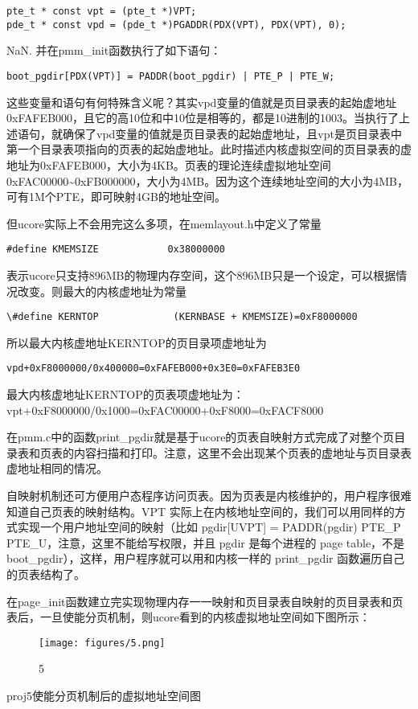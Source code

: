\begin{lstlisting}
pte_t * const vpt = (pte_t *)VPT;
pde_t * const vpd = (pde_t *)PGADDR(PDX(VPT), PDX(VPT), 0);
\end{lstlisting}

NaN. 并在pmm\_init函数执行了如下语句：

\begin{lstlisting}
boot_pgdir[PDX(VPT)] = PADDR(boot_pgdir) | PTE_P | PTE_W;
\end{lstlisting}

这些变量和语句有何特殊含义呢？其实vpd变量的值就是页目录表的起始虚地址0xFAFEB000，且它的高10位和中10位是相等的，都是10进制的1003。当执行了上述语句，就确保了vpd变量的值就是页目录表的起始虚地址，且vpt是页目录表中第一个目录表项指向的页表的起始虚地址。此时描述内核虚拟空间的页目录表的虚地址为0xFAFEB000，大小为4KB。页表的理论连续虚拟地址空间0xFAC00000\textasciitilde{}0xFB000000，大小为4MB。因为这个连续地址空间的大小为4MB，可有1M个PTE，即可映射4GB的地址空间。

但ucore实际上不会用完这么多项，在memlayout.h中定义了常量

\begin{lstlisting}
#define KMEMSIZE            0x38000000
\end{lstlisting}

表示ucore只支持896MB的物理内存空间，这个896MB只是一个设定，可以根据情况改变。则最大的内核虚地址为常量

\begin{lstlisting}
\#define KERNTOP             (KERNBASE + KMEMSIZE)=0xF8000000
\end{lstlisting}

所以最大内核虚地址KERNTOP的页目录项虚地址为

\begin{lstlisting}
vpd+0xF8000000/0x400000=0xFAFEB000+0x3E0=0xFAFEB3E0
\end{lstlisting}

最大内核虚地址KERNTOP的页表项虚地址为：
vpt+0xF8000000/0x1000=0xFAC00000+0xF8000=0xFACF8000

在pmm.c中的函数print\_pgdir就是基于ucore的页表自映射方式完成了对整个页目录表和页表的内容扫描和打印。注意，这里不会出现某个页表的虚地址与页目录表虚地址相同的情况。

自映射机制还可方便用户态程序访问页表。因为页表是内核维护的，用户程序很难知道自己页表的映射结构。VPT
实际上在内核地址空间的，我们可以用同样的方式实现一个用户地址空间的映射（比如
pgdir{[}UVPT{]} = PADDR(pgdir) \textbar{} PTE\_P \textbar{}
PTE\_U，注意，这里不能给写权限，并且 pgdir 是每个进程的 page table，不是
boot\_pgdir），这样，用户程序就可以用和内核一样的 print\_pgdir
函数遍历自己的页表结构了。

在page\_init函数建立完实现物理内存一一映射和页目录表自映射的页目录表和页表后，一旦使能分页机制，则ucore看到的内核虚拟地址空间如下图所示：

\begin{figure}[htbp]
\centering
\texttt{[image: figures/5.png]}
\caption{5}
\end{figure}

proj5使能分页机制后的虚拟地址空间图
